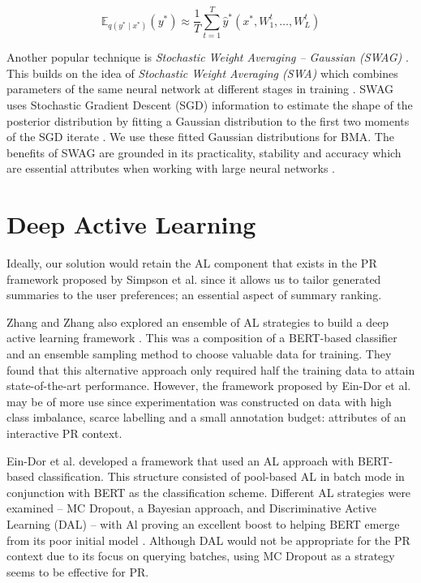 $$
	\mathbb{E}_{q(y^\ast \mid x^\ast)}(y^\ast) \approx \frac{1}{T} \sum_{t=1}^{T} \hat{y}^\ast(x^\ast, W_{1}^{t}, \ldots, W_{L}^{t})
$$

Another popular technique is \emph{Stochastic Weight Averaging – Gaussian (SWAG)} \cite{Maddox19}. This builds on the idea of \emph{Stochastic Weight Averaging (SWA)} which combines parameters of the same neural network at different stages in training \cite{Dmitrii18}. SWAG uses Stochastic Gradient Descent (SGD) information to estimate the shape of the posterior distribution by fitting a Gaussian distribution to the first two moments of the SGD iterate \cite{Maddox19}. We use these fitted Gaussian distributions for BMA. The benefits of SWAG are grounded in its practicality, stability and accuracy which are essential attributes when working with large neural networks \cite{Maddox19}.

			
\section{Deep Active Learning}
\label{chap:literaturereview:deepactive}

Ideally, our solution would retain the AL component that exists in the PR framework proposed by Simpson et al. \cite{Simpson19} since it allows us to tailor generated summaries to the user preferences; an essential aspect of summary ranking.
		
\medbreak
Zhang and Zhang also explored an ensemble of AL strategies to build a deep active learning framework \cite{Zhang19}. This was a composition of a BERT-based classifier and an ensemble sampling method to choose valuable data for training. They found that this alternative approach only required half the training data to attain state-of-the-art performance. However, the framework proposed by Ein-Dor et al. \cite{EinDor20} may be of more use since experimentation was constructed on data with high class imbalance, scarce labelling and a small annotation budget: attributes of an interactive PR context.  
		
\medbreak
Ein-Dor et al. \cite{EinDor20} developed a framework that used an AL approach with BERT-based classification. This structure consisted of pool-based AL in batch mode in conjunction with BERT as the classification scheme. Different AL strategies were examined – MC Dropout, a Bayesian approach, and Discriminative Active Learning (DAL) \cite{Gissin19} – with Al proving an excellent boost to helping BERT emerge from its poor initial model \cite{EinDor20}. Although DAL would not be appropriate for the PR context due to its focus on querying batches, using MC Dropout as a strategy seems to be effective for PR.
		
